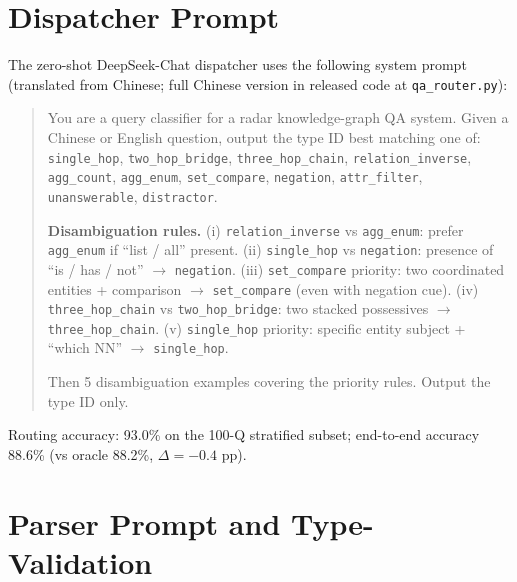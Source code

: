 \documentclass[11pt,a4paper]{article}
\begin{document}



\appendix
\section{Dispatcher Prompt}
\label{app:dispatcher}

The zero-shot DeepSeek-Chat dispatcher uses the following system prompt (translated from Chinese; full Chinese version in released code at \texttt{qa\_router.py}):

\begin{quote}\small
You are a query classifier for a radar knowledge-graph QA system. Given a Chinese or English question, output the type ID best matching one of: \texttt{single\_hop}, \texttt{two\_hop\_bridge}, \texttt{three\_hop\_chain}, \texttt{relation\_inverse}, \texttt{agg\_count}, \texttt{agg\_enum}, \texttt{set\_compare}, \texttt{negation}, \texttt{attr\_filter}, \texttt{unanswerable}, \texttt{distractor}.

\textbf{Disambiguation rules.} (i) \texttt{relation\_inverse} vs \texttt{agg\_enum}: prefer \texttt{agg\_enum} if ``list / all'' present. (ii) \texttt{single\_hop} vs \texttt{negation}: presence of ``is / has / not'' $\to$ \texttt{negation}. (iii) \texttt{set\_compare} priority: two coordinated entities + comparison $\to$ \texttt{set\_compare} (even with negation cue). (iv) \texttt{three\_hop\_chain} vs \texttt{two\_hop\_bridge}: two stacked possessives $\to$ \texttt{three\_hop\_chain}. (v) \texttt{single\_hop} priority: specific entity subject + ``which NN'' $\to$ \texttt{single\_hop}.

Then 5 disambiguation examples covering the priority rules. Output the type ID only.
\end{quote}

Routing accuracy: 93.0\% on the 100-Q stratified subset; end-to-end accuracy 88.6\% (vs oracle 88.2\%, $\Delta=-0.4$ pp).

\section{Parser Prompt and Type-Validation}
\label{app:parser}
\end{document}
